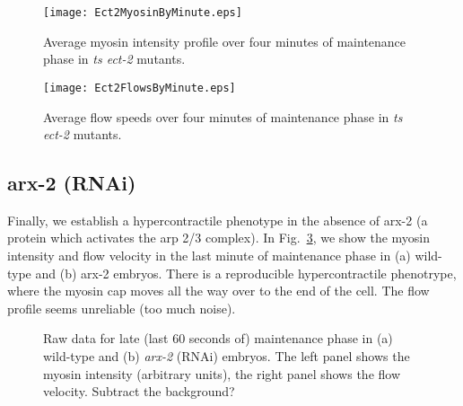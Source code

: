 \documentclass[11pt]{article}
\newcommand{\red}[1]{\color{red}#1\normalcolor}
\newcommand{\6}[1]{#1_{\text{6}}}
\newcommand{\3}[1]{#1_{\text{3}}}
\begin{document}
\begin{figure}
\centering
\texttt{[image: Ect2MyosinByMinute.eps]}
\caption{\label{fig:Ect2MyMin} Average myosin intensity profile over four minutes of maintenance phase in \emph{ts ect-2} mutants.}
\end{figure}

\begin{figure}
\centering
\texttt{[image: Ect2FlowsByMinute.eps]}
\caption{\label{fig:Ect2FlowMin} Average flow speeds over four minutes of maintenance phase in \emph{ts ect-2} mutants. }
\end{figure}

\subsection{arx-2 (RNAi)}
Finally, we establish a hypercontractile phenotype in the absence of arx-2 (a protein which activates the arp 2/3 complex). In Fig.\ \ref{fig:Arp23}, we show the myosin intensity and flow velocity in the last minute of maintenance phase in (a) wild-type and (b) arx-2 embryos. \red{There is a reproducible hypercontractile phenotrype, where the myosin cap moves all the way over to the end of the cell. The flow profile seems unreliable (too much noise).}

\begin{figure}
\centering
{}
\caption{\label{fig:Arp23} Raw data for late (last 60 seconds of) maintenance phase in (a) wild-type and (b) \emph{arx-2} (RNAi) embryos. The left panel shows the myosin intensity (arbitrary units), the right panel shows the flow velocity. \red{Subtract the background?}}
\end{figure}
\end{document}
